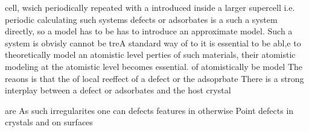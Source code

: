 \documentclass[a4paper,11pt,headings=normal]{scrartcl}
\begin{document}
cell, wsich periodically repeated with a introduced inside a larger supercell  i.e. periodic    calculating such systems  defects or adsorbates is a  such a system directly, so a model has to be  has to introduce an approximate model.  Such a system is obvisly cannot be treA standard way of   to it is essential to be abl,e to theoretically model an atomistic level perties of such materials, their atomistic modeling at the atomistic level becomes essential. of  atomistically be model      The reaons is that the  of      local reeffect of a defect or the adsoprbate  There is a strong interplay between a defect or adsorbates and the host crystal 



are   As such irregularites one can defects      features in otherwise Point defects in crystals and on surfaces  
\end{document}
